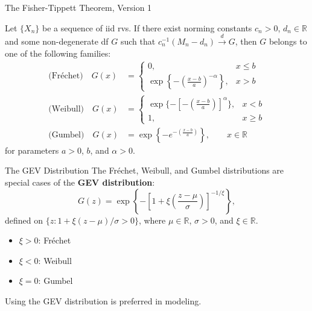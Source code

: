 \documentclass{beamer}
\begin{document}
\begin{frame}{The Fisher-Tippett Theorem, Version 1}
    \begin{theorem}
        Let $\{X_n\}$ be a sequence of iid rvs. If there exist norming constants $c_n > 0$, $d_n \in \mathbb{R}$ and some non-degenerate df $G$ such that $c_n^{-1}(M_n - d_n) \xrightarrow{d} G$, then $G$ belongs to one of the following families:
        \begin{align*}
            \text{(Fr\'{e}chet)} \quad G(x) &=
            \begin{cases}
                0, & x \le b \\
                \exp\left\{-\left(\frac{x - b}{a}\right)^{-\alpha}\right\}, & x > b
            \end{cases} \\
            \text{(Weibull)} \quad G(x) &=
            \begin{cases}
                \exp\{-\left[-\left(\frac{x - b}{a}\right)\right]^{\alpha}\}, & x < b \\
                1, & x \ge b
            \end{cases} \\
            \text{(Gumbel)} \quad G(x) &= \exp\left\{-e^{-\left(\frac{x - b}{a}\right)}\right\}, \qquad x \in \mathbb{R}
        \end{align*}
        for parameters $a > 0$, $b$, and $\alpha > 0$.
    \end{theorem}
\end{frame}

\begin{frame}{The GEV Distribution}
    The Fr\'{e}chet, Weibull, and Gumbel distributions are special cases of the \textbf{GEV distribution}:
    \[
    G(z) = \exp\left\{-\left[1 + \xi\left(\frac{z - \mu}{\sigma}\right)\right]^{-1 / \xi}\right\},
    \]
    defined on $\{z : 1 + \xi(z - \mu) / \sigma > 0\}$, where $\mu \in \mathbb{R}$, $\sigma > 0$, and $\xi \in \mathbb{R}$.

    \begin{itemize}
        \item $\xi > 0$: Fr\'{e}chet
        \item $\xi < 0$: Weibull
        \item $\xi = 0$: Gumbel
    \end{itemize}

    \medskip

    Using the GEV distribution is preferred in modeling.
\end{frame}
\end{document}

